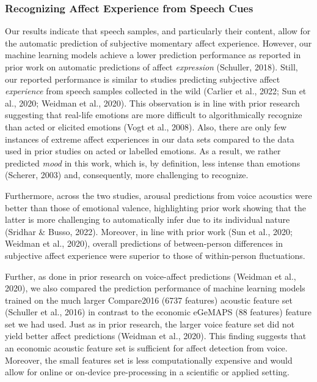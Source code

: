 \documentclass[
  man,floatsintext]{apa6}
\begin{document}
\hypertarget{recognizing-affect-experience-from-speech-cues}{%
\subsubsection{Recognizing Affect Experience from Speech Cues}\label{recognizing-affect-experience-from-speech-cues}}

Our results indicate that speech samples, and particularly their content, allow for the automatic prediction of subjective momentary affect experience. However, our machine learning models achieve a lower prediction performance as reported in prior work on automatic predictions of affect \emph{expression} (Schuller, 2018). Still, our reported performance is similar to studies predicting subjective affect \emph{experience} from speech samples collected in the wild (Carlier et al., 2022; Sun et al., 2020; Weidman et al., 2020). This observation is in line with prior research suggesting that real-life emotions are more difficult to algorithmically recognize than acted or elicited emotions (Vogt et al., 2008). Also, there are only few instances of extreme affect experiences in our data sets compared to the data used in prior studies on acted or labelled emotions. As a result, we rather predicted \emph{mood} in this work, which is, by definition, less intense than emotions (Scherer, 2003) and, consequently, more challenging to recognize.

Furthermore, across the two studies, arousal predictions from voice acoustics were better than those of emotional valence, highlighting prior work showing that the latter is more challenging to automatically infer due to its individual nature (Sridhar \& Busso, 2022). Moreover, in line with prior work (Sun et al., 2020; Weidman et al., 2020), overall predictions of between-person differences in subjective affect experience were superior to those of within-person fluctuations.

Further, as done in prior research on voice-affect predictions (Weidman et al., 2020), we also compared the prediction performance of machine learning models trained on the much larger Compare2016 (6737 features) acoustic feature set (Schuller et al., 2016) in contrast to the economic eGeMAPS (88 features) feature set we had used. Just as in prior research, the larger voice feature set did not yield better affect predictions (Weidman et al., 2020). This finding suggests that an economic acoustic feature set is sufficient for affect detection from voice. Moreover, the small features set is less computationally expensive and would allow for online or on-device pre-processing in a scientific or applied setting.
\end{document}
